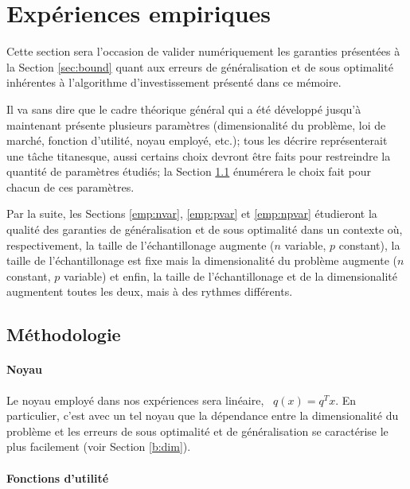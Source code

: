 \section{Expériences empiriques}
\label{sec:emp}

Cette section sera l'occasion de valider numériquement les garanties présentées à la
Section \ref{sec:bound} quant aux erreurs de généralisation et de sous optimalité
inhérentes à l'algorithme d'investissement présenté dans ce mémoire.

Il va sans dire que le cadre théorique général qui a été développé jusqu'à maintenant
présente plusieurs paramètres (dimensionalité du problème, loi de marché, fonction
d'utilité, noyau employé, etc.); tous les décrire représenterait une tâche titanesque,
aussi certains choix devront être faits pour restreindre la quantité de paramètres
étudiés; la Section \ref{emp:metho} énumérera le choix fait pour chacun de ces paramètres.

Par la suite, les Sections \ref{emp:nvar}, \ref{emp:pvar} et \ref{emp:npvar} étudieront la
qualité des garanties de généralisation et de sous optimalité dans un contexte où,
respectivement, la taille de l'échantillonage augmente ($n$ variable, $p$ constant), la
taille de l'échantillonage est fixe mais la dimensionalité du problème augmente ($n$
constant, $p$ variable) et enfin, la taille de l'échantillonage et de la dimensionalité
augmentent toutes les deux, mais à des rythmes différents.



\subsection{Méthodologie}
\label{emp:metho}

\paragraph{Noyau}

Le noyau employé dans nos expériences sera linéaire, \ie\ $q(x) = q^Tx$. En particulier,
c'est avec un tel noyau que la dépendance entre la dimensionalité du problème et les
erreurs de sous optimalité et de généralisation se caractérise le plus facilement (voir
Section \ref{b:dim}).

\paragraph{Fonctions d'utilité}

